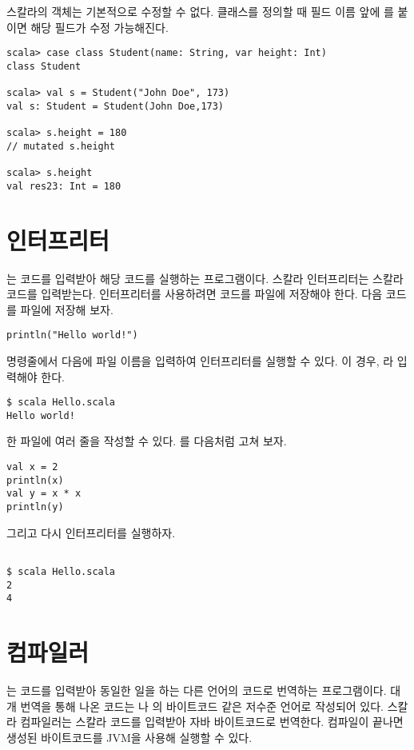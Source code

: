 스칼라의 객체는 기본적으로 수정할 수 없다. 클래스를 정의할 때 필드 이름 앞에
를 붙이면 해당 필드가 수정 가능해진다.

\begin{verbatim}
scala> case class Student(name: String, var height: Int)
class Student

scala> val s = Student("John Doe", 173)
val s: Student = Student(John Doe,173)

scala> s.height = 180
// mutated s.height

scala> s.height
val res23: Int = 180
\end{verbatim}

\section{인터프리터}

는 코드를 입력받아 해당 코드를 실행하는 프로그램이다. 스칼라
인터프리터는 스칼라 코드를 입력받는다. 인터프리터를 사용하려면 코드를 파일에
저장해야 한다. 다음 코드를  파일에 저장해 보자.

\begin{verbatim}
println("Hello world!")
\end{verbatim}

명령줄에서  다음에 파일 이름을 입력하여 인터프리터를 실행할 수 있다. 이
경우, 라 입력해야 한다.

\begin{verbatim}
$ scala Hello.scala
Hello world!
\end{verbatim}

한 파일에 여러 줄을 작성할 수 있다. 를 다음처럼 고쳐 보자.

\begin{verbatim}
val x = 2
println(x)
val y = x * x
println(y)
\end{verbatim}

그리고 다시 인터프리터를 실행하자.
\begin{verbatim}

$ scala Hello.scala
2
4
\end{verbatim}

\section{컴파일러}

는 코드를 입력받아 동일한 일을 하는 다른 언어의 코드로 번역하는
프로그램이다. 대개 번역을 통해 나온 코드는 나
의 바이트코드 같은 저수준 언어로 작성되어 있다. 스칼라
컴파일러는 스칼라 코드를 입력받아 자바 바이트코드로 번역한다. 컴파일이 끝나면
생성된 바이트코드를 JVM을 사용해 실행할 수 있다.

